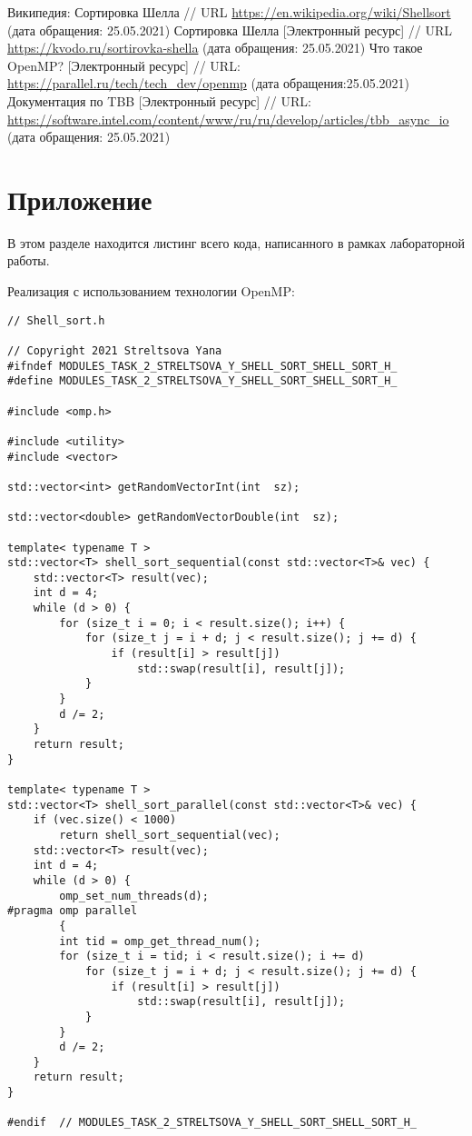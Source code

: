 \documentclass{report}
\begin{document}
\begin{thebibliography}{1}
 Википедия: Сортировка Шелла // URL \url {https://en.wikipedia.org/wiki/Shellsort} (дата обращения: 25.05.2021)
 Сортировка Шелла [Электронный ресурс] // URL \url {https://kvodo.ru/sortirovka-shella} (дата обращения: 25.05.2021)
Что такое OpenMP? [Электронный ресурс] // URL: \url {https://parallel.ru/tech/tech_dev/openmp} (дата обращения:25.05.2021)
Документация по TBB [Электронный ресурс] // URL: \url {https://software.intel.com/content/www/ru/ru/develop/articles/tbb_async_io} (дата обращения: 25.05.2021)
\end{thebibliography}
\newpage

\section*{Приложение}
В этом разделе находится листинг всего кода, написанного в рамках лабораторной работы.
\par Реализация с использованием технологии OpenMP:
\begin{lstlisting}
// Shell_sort.h

// Copyright 2021 Streltsova Yana
#ifndef MODULES_TASK_2_STRELTSOVA_Y_SHELL_SORT_SHELL_SORT_H_
#define MODULES_TASK_2_STRELTSOVA_Y_SHELL_SORT_SHELL_SORT_H_

#include <omp.h>

#include <utility>
#include <vector>

std::vector<int> getRandomVectorInt(int  sz);

std::vector<double> getRandomVectorDouble(int  sz);

template< typename T >
std::vector<T> shell_sort_sequential(const std::vector<T>& vec) {
    std::vector<T> result(vec);
    int d = 4;
    while (d > 0) {
        for (size_t i = 0; i < result.size(); i++) {
            for (size_t j = i + d; j < result.size(); j += d) {
                if (result[i] > result[j])
                    std::swap(result[i], result[j]);
            }
        }
        d /= 2;
    }
    return result;
}

template< typename T >
std::vector<T> shell_sort_parallel(const std::vector<T>& vec) {
    if (vec.size() < 1000)
        return shell_sort_sequential(vec);
    std::vector<T> result(vec);
    int d = 4;
    while (d > 0) {
        omp_set_num_threads(d);
#pragma omp parallel
        {
        int tid = omp_get_thread_num();
        for (size_t i = tid; i < result.size(); i += d)
            for (size_t j = i + d; j < result.size(); j += d) {
                if (result[i] > result[j])
                    std::swap(result[i], result[j]);
            }
        }
        d /= 2;
    }
    return result;
}

#endif  // MODULES_TASK_2_STRELTSOVA_Y_SHELL_SORT_SHELL_SORT_H_


\end{lstlisting}
\end{document}
